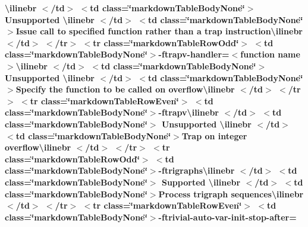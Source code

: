 \begin{longtabu}
{\bfseries{{\ttfamily \textbackslash{}ilinebr \texorpdfstring{$<$}{<}/td\texorpdfstring{$>$}{>} \texorpdfstring{$<$}{<}td class=\char`\"{}markdown\+Table\+Body\+None\char`\"{}\texorpdfstring{$>$}{>} Unsupported \textbackslash{}ilinebr \texorpdfstring{$<$}{<}/td\texorpdfstring{$>$}{>} \texorpdfstring{$<$}{<}td class=\char`\"{}markdown\+Table\+Body\+None\char`\"{}\texorpdfstring{$>$}{>}}Issue call to specified function rather than a trap instruction{\ttfamily \textbackslash{}ilinebr \texorpdfstring{$<$}{<}/td\texorpdfstring{$>$}{>} \texorpdfstring{$<$}{<}/tr\texorpdfstring{$>$}{>} \texorpdfstring{$<$}{<}tr class=\char`\"{}markdown\+Table\+Row\+Odd\char`\"{}\texorpdfstring{$>$}{>} \texorpdfstring{$<$}{<}td class=\char`\"{}markdown\+Table\+Body\+None\char`\"{}\texorpdfstring{$>$}{>}}-\/ftrapv-\/handler=$<$function name$>${\ttfamily \textbackslash{}ilinebr \texorpdfstring{$<$}{<}/td\texorpdfstring{$>$}{>} \texorpdfstring{$<$}{<}td class=\char`\"{}markdown\+Table\+Body\+None\char`\"{}\texorpdfstring{$>$}{>} Unsupported \textbackslash{}ilinebr \texorpdfstring{$<$}{<}/td\texorpdfstring{$>$}{>} \texorpdfstring{$<$}{<}td class=\char`\"{}markdown\+Table\+Body\+None\char`\"{}\texorpdfstring{$>$}{>}}Specify the function to be called on overflow{\ttfamily \textbackslash{}ilinebr \texorpdfstring{$<$}{<}/td\texorpdfstring{$>$}{>} \texorpdfstring{$<$}{<}/tr\texorpdfstring{$>$}{>} \texorpdfstring{$<$}{<}tr class=\char`\"{}markdown\+Table\+Row\+Even\char`\"{}\texorpdfstring{$>$}{>} \texorpdfstring{$<$}{<}td class=\char`\"{}markdown\+Table\+Body\+None\char`\"{}\texorpdfstring{$>$}{>}}-\/ftrapv{\ttfamily \textbackslash{}ilinebr \texorpdfstring{$<$}{<}/td\texorpdfstring{$>$}{>} \texorpdfstring{$<$}{<}td class=\char`\"{}markdown\+Table\+Body\+None\char`\"{}\texorpdfstring{$>$}{>} Unsupported \textbackslash{}ilinebr \texorpdfstring{$<$}{<}/td\texorpdfstring{$>$}{>} \texorpdfstring{$<$}{<}td class=\char`\"{}markdown\+Table\+Body\+None\char`\"{}\texorpdfstring{$>$}{>}}Trap on integer overflow{\ttfamily \textbackslash{}ilinebr \texorpdfstring{$<$}{<}/td\texorpdfstring{$>$}{>} \texorpdfstring{$<$}{<}/tr\texorpdfstring{$>$}{>} \texorpdfstring{$<$}{<}tr class=\char`\"{}markdown\+Table\+Row\+Odd\char`\"{}\texorpdfstring{$>$}{>} \texorpdfstring{$<$}{<}td class=\char`\"{}markdown\+Table\+Body\+None\char`\"{}\texorpdfstring{$>$}{>}}-\/ftrigraphs{\ttfamily \textbackslash{}ilinebr \texorpdfstring{$<$}{<}/td\texorpdfstring{$>$}{>} \texorpdfstring{$<$}{<}td class=\char`\"{}markdown\+Table\+Body\+None\char`\"{}\texorpdfstring{$>$}{>} Supported \textbackslash{}ilinebr \texorpdfstring{$<$}{<}/td\texorpdfstring{$>$}{>} \texorpdfstring{$<$}{<}td class=\char`\"{}markdown\+Table\+Body\+None\char`\"{}\texorpdfstring{$>$}{>}}Process trigraph sequences{\ttfamily \textbackslash{}ilinebr \texorpdfstring{$<$}{<}/td\texorpdfstring{$>$}{>} \texorpdfstring{$<$}{<}/tr\texorpdfstring{$>$}{>} \texorpdfstring{$<$}{<}tr class=\char`\"{}markdown\+Table\+Row\+Even\char`\"{}\texorpdfstring{$>$}{>} \texorpdfstring{$<$}{<}td class=\char`\"{}markdown\+Table\+Body\+None\char`\"{}\texorpdfstring{$>$}{>}}-\/ftrivial-\/auto-\/var-\/init-\/stop-\/after=}}


\end{longtabu}

